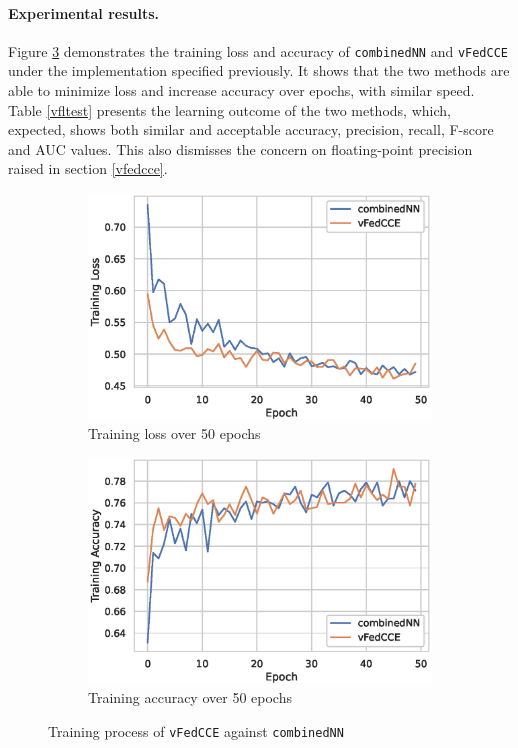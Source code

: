 \documentclass{article}
\begin{document}
\paragraph{Experimental results.} Figure \ref{fig:vflexp} demonstrates the training loss and accuracy of \texttt{combinedNN} and \texttt{vFedCCE} under the implementation specified previously. It shows that the two methods are able to minimize loss and increase accuracy over epochs, with similar speed. Table \ref{vfltest} presents the learning outcome of the two methods, which, expected, shows both similar and acceptable accuracy, precision, recall, F-score and AUC values. This also dismisses the concern on floating-point precision raised in section \ref{vfedcce}.

\begin{figure}[h]
\centering
\begin{subfigure}{.5\textwidth}
  \centering
  \includegraphics[width=\linewidth]{./images/vfl_train_loss.eps}
  \caption{Training loss over 50 epochs}
  \label{fig:vflloss}
\end{subfigure}%
\begin{subfigure}{.5\textwidth}
  \centering
  \includegraphics[width=\linewidth]{./images/vfl_train_acc.eps}
  \caption{Training accuracy over 50 epochs}
  \label{fig:vflacc}
\end{subfigure}
\caption{Training process of \texttt{vFedCCE} against \texttt{combinedNN}}
\label{fig:vflexp}
\end{figure}
\end{document}
